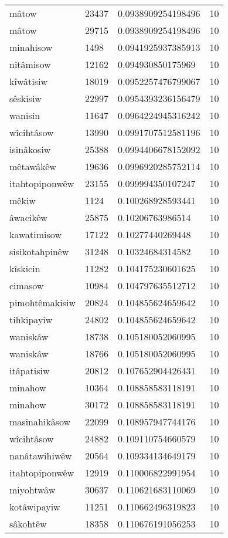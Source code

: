 \begin{longtable}{llll}
mâtow & 23437 & 0.0938909254198496 & 10 \\
mâtow & 29715 & 0.0938909254198496 & 10 \\
minahisow & 1498 & 0.0941925937385913 & 10 \\
nitâmisow & 12162 & 0.094930850175969 & 10 \\
kîwâtisiw & 18019 & 0.0952257476799067 & 10 \\
sêskisiw & 22997 & 0.0954393236156479 & 10 \\
wanisin & 11647 & 0.0964224945316242 & 10 \\
wîcihtâsow & 13990 & 0.0991707512581196 & 10 \\
isinâkosiw & 25388 & 0.0994406678152092 & 10 \\
mêtawâkêw & 19636 & 0.0996920285752114 & 10 \\
itahtopiponwêw & 23155 & 0.099994350107247 & 10 \\
mêkiw & 1124 & 0.100268928593441 & 10 \\
âwacikêw & 25875 & 0.10206763986514 & 10 \\
kawatimisow & 17122 & 0.10277440269448 & 10 \\
sisikotahpinêw & 31248 & 0.10324684314582 & 10 \\
kîskicin & 11282 & 0.104175230601625 & 10 \\
cimasow & 10984 & 0.104797635512712 & 10 \\
pimohtêmakisiw & 20824 & 0.104855624659642 & 10 \\
tihkipayiw & 24802 & 0.104855624659642 & 10 \\
waniskâw & 18738 & 0.105180052060995 & 10 \\
waniskâw & 18766 & 0.105180052060995 & 10 \\
itâpatisiw & 20812 & 0.107652904426431 & 10 \\
minahow & 10364 & 0.108858583118191 & 10 \\
minahow & 30172 & 0.108858583118191 & 10 \\
masinahikâsow & 22099 & 0.108957947744176 & 10 \\
wîcihtâsow & 24882 & 0.109110754660579 & 10 \\
nanâtawihiwêw & 20564 & 0.109334134649179 & 10 \\
itahtopiponwêw & 12919 & 0.110006822991954 & 10 \\
miyohtwâw & 30637 & 0.110621683110069 & 10 \\
kotâwipayiw & 11251 & 0.110662496319823 & 10 \\
sâkohtêw & 18358 & 0.110676191056253 & 10 \\

\end{longtable}
